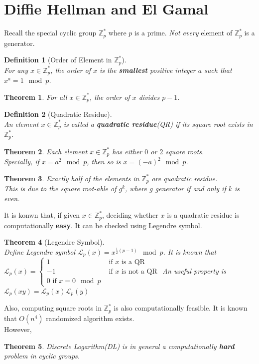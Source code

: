 \documentclass[12pt]{article}
\newtheorem{definition}{Definition}[section]
\newtheorem{theorem}{Theorem}[section]
\theoremstyle{definition}
\begin{document}
\section{Diffie Hellman and El Gamal}
Recall the special cyclic group $\mathbb{Z}_p^\ast$ where $p$ is a prime. \textit{Not every} element of $\mathbb{Z}_p^\ast$ is a generator. 
\begin{definition}[Order of Element in {$\mathbb{Z}^\ast_p$}]
\hfill\\\normalfont For any $x\in \mathbb{Z}^\ast_p$, the order of $x$ is the \textbf{smallest} positive integer $a$ such that $x^a=1\mod p$.
\end{definition}
\begin{theorem}\normalfont For all $x\in\mathbb{Z}^\ast_p$, the order of $x$ divides $p-1$.
\end{theorem}
\begin{definition}[Quadratic Residue]
\hfill\\\normalfont An element $x\in \mathbb{Z}^\ast_p$ is called a \textbf{quadratic residue}(QR) if its square root exists in $\mathbb{Z}^\ast_p$.
\end{definition}
\begin{theorem}\normalfont Each element $x\in \mathbb{Z}^\ast_p$ has either $0$ or $2$ square roots.\\
Specially, if $x=a^2\mod p$, then so is $x=(-a)^2\mod p$.
\end{theorem}
\begin{theorem}\normalfont Exactly half of the elements in $\mathbb{Z}^\ast_p$ are quadratic residue.\\
This is due to the square root-able of $g^{k}$, where $g$ generator if and only if $k$ is even.
\end{theorem}
It is konwn that, if given $x\in \mathbb{Z}^\ast_p$, deciding whether $x$ is a quadratic residue is computationally \textbf{easy}. It can be checked using Legendre symbol.
\begin{theorem}[Legendre Symbol]
\hfill\\\normalfont Define Legendre symbol $\mathcal{L}_p(x)=x^{\frac{1}{2}(p-1)}\mod p$. It is known that
$
\mathcal{L}_p(x)=\begin{cases}
1 & \text{ if }x\text{ is a QR}\\
-1& \text{ if }x\text{ is not a QR}\\
0 \text{ if }x=0\mod p
\end{cases}
$
An useful property is
$
\mathcal{L}_p(xy)=\mathcal{L}_p(x)\mathcal{L}_p(y)
$
\end{theorem}
Also, computing square roots in $\mathbb{Z}^\ast_p$ is also computationally feasible. It is known that $O(n^4)$ randomized algorithm exists.\\
However,
\begin{theorem}\normalfont Discrete Logarithm(DL) is in general a computationally \textbf{hard} problem in cyclic groups.
\end{theorem}
\end{document}
